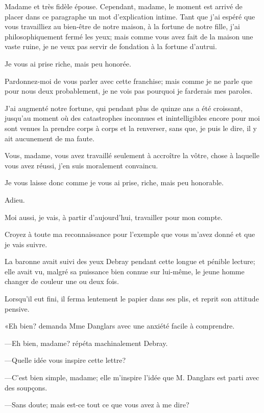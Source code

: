 \begin{mail}{}{Madame et très fidèle épouse.}
Cependant, madame, le moment est arrivé de placer dans ce paragraphe un mot d'explication intime. Tant que j'ai espéré que vous travailliez au bien-être de notre maison, à la fortune de notre fille, j'ai philosophiquement fermé les yeux; mais comme vous avez fait de la maison une vaste ruine, je ne veux pas servir de fondation à la fortune d'autrui. 

Je vous ai prise riche, mais peu honorée. 

Pardonnez-moi de vous parler avec cette franchise; mais comme je ne parle que pour nous deux probablement, je ne vois pas pourquoi je farderais mes paroles. 

J'ai augmenté notre fortune, qui pendant plus de quinze ans a été croissant, jusqu'au moment où des catastrophes inconnues et inintelligibles encore pour moi sont venues la prendre corps à corps et la renverser, sans que, je puis le dire, il y ait aucunement de ma faute. 

Vous, madame, vous avez travaillé seulement à accroître la vôtre, chose à laquelle vous avez réussi, j'en suis moralement convaincu. 

Je vous laisse donc comme je vous ai prise, riche, mais peu honorable. 

Adieu. 

Moi aussi, je vais, à partir d'aujourd'hui, travailler pour mon compte. 

Croyez à toute ma reconnaissance pour l'exemple que vous m'avez donné et que je vais suivre. 

\end{mail}

La baronne avait suivi des yeux Debray pendant cette longue et pénible lecture; elle avait vu, malgré sa puissance bien connue sur lui-même, le jeune homme changer de couleur une ou deux fois. 

Lorsqu'il eut fini, il ferma lentement le papier dans ses plis, et reprit son attitude pensive. 

«Eh bien? demanda Mme Danglars avec une anxiété facile à comprendre. 

—Eh bien, madame? répéta machinalement Debray. 

—Quelle idée vous inspire cette lettre? 

—C'est bien simple, madame; elle m'inspire l'idée que M. Danglars est parti avec des soupçons. 

—Sans doute; mais est-ce tout ce que vous avez à me dire? 

